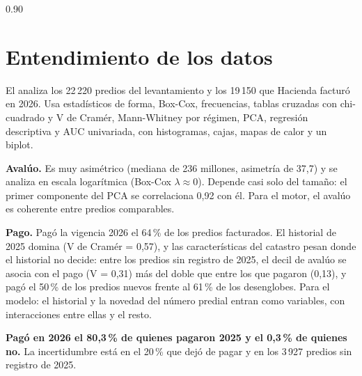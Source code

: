 \documentclass[12pt,letterpaper]{article}
\begin{document}
\begin{espacio}{0.90}
\section{Entendimiento de los datos} %
El  analiza los 22\,220 predios del levantamiento y los 19\,150 que Hacienda facturó en
2026. Usa estadísticos de forma, Box-Cox, frecuencias, tablas cruzadas con chi-cuadrado y V de
Cramér, Mann-Whitney por régimen, PCA, regresión descriptiva y AUC univariada, con histogramas,
cajas, mapas de calor y un biplot.

\textbf{Avalúo.} Es muy asimétrico (mediana de 236 millones, asimetría de 37,7) y se analiza en
escala logarítmica (Box-Cox $\lambda \approx 0$). Depende casi solo del tamaño: el primer
componente del PCA se correlaciona 0,92 con él. Para el motor, el avalúo es coherente entre
predios comparables.

\textbf{Pago.} Pagó la vigencia 2026 el 64\,\% de los predios facturados. El historial de 2025
domina (V de Cramér = 0,57), y las características del catastro pesan donde el historial no
decide: entre los predios sin registro de 2025, el decil de avalúo se asocia con el pago
(V = 0,31) más del doble que entre los que pagaron (0,13), y pagó el 50\,\% de los predios nuevos
frente al 61\,\% de los desenglobes. Para el modelo: el historial y la novedad del número predial
entran como variables, con interacciones entre ellas y el resto.

\begin{destacado}
\textbf{Pagó en 2026 el 80,3\,\% de quienes pagaron 2025 y el 0,3\,\% de quienes no.} La
incertidumbre está en el 20\,\% que dejó de pagar y en los 3\,927 predios sin registro de 2025.
\end{destacado}


\end{espacio}
\end{document}
